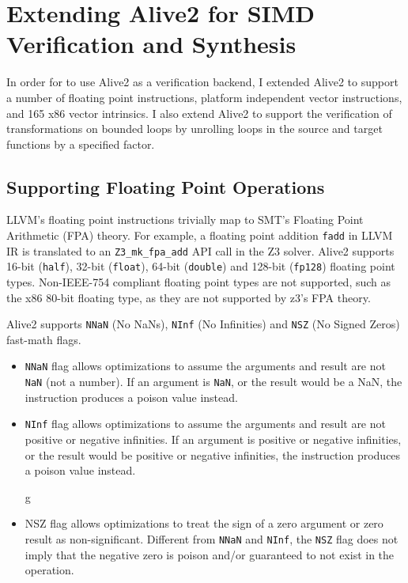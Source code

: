 \chapter{Extending Alive2 for SIMD Verification and Synthesis}
\label{chap:extending-alive2}

In order for \minotaur{} to use Alive2 as a verification backend, I extended
Alive2 to support a number of floating point instructions,
platform independent vector instructions, and 165 x86 vector intrinsics.
%
I also extend Alive2 to support the verification of transformations on
bounded loops by unrolling loops in the source and target functions by
a specified factor.

\section{Supporting Floating Point Operations}

LLVM's floating point instructions trivially map to SMT's Floating
Point Arithmetic (FPA) theory.
%
For example, a floating point addition \texttt{fadd} in LLVM IR is
translated to an \texttt{Z3\_mk\_fpa\_add} API call in the Z3 solver.
%
Alive2 supports 16-bit (\texttt{half}), 32-bit (\texttt{float}), 64-bit
(\texttt{double}) and 128-bit (\texttt{fp128}) floating point types.
%
Non-IEEE-754 compliant floating point types are not supported, such as
the x86 80-bit floating type, as they are not supported by z3's FPA
theory.

Alive2 supports \texttt{NNaN} (No NaNs), \texttt{NInf} (No Infinities) and
\texttt{NSZ} (No Signed Zeros) fast-math flags.

\begin{itemize}

\item \texttt{NNaN} flag allows optimizations to assume the arguments
and result are not \texttt{NaN} (not a number). If an argument is
\texttt{NaN}, or the result would be a NaN, the instruction produces a
poison value instead.

\item \texttt{NInf} flag allows optimizations to assume the arguments
and result are not positive or negative infinities. If an argument is
positive or negative infinities, or the result would be positive or
negative infinities, the instruction produces a poison value instead.

g\item NSZ flag allows optimizations to treat the sign of a zero
argument or zero result as non-significant. Different from
\texttt{NNaN} and \texttt{NInf}, the \texttt{NSZ} flag does not imply
that the negative zero is poison and/or guaranteed to not exist in the
operation.

\end{itemize}

